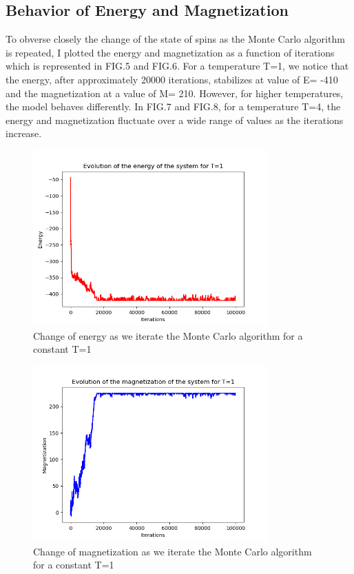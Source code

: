 \documentclass[aps,twocolumn,twoside,secnumarabic,balancelastpage,amsmath,amssymb,nofootinbib,hyperref=pdftex]{revtex4}
\begin{document}
\subsection{Behavior of Energy and Magnetization}
To obverse closely the change of the state of spins as the Monte Carlo algorithm is repeated, I plotted the energy and magnetization as a function of iterations which is represented in FIG.5 and FIG.6. For a temperature T=1, we notice that the energy, after approximately 20000 iterations, stabilizes at value of E= -410 and the magnetization at a value of M= 210. However, for higher temperatures, the model behaves differently. In FIG.7 and FIG.8, for a temperature T=4, the energy and magnetization fluctuate over a wide range of values as the iterations increase. 
\begin{figure}[htb]
\includegraphics[width=9cm]{E_iteration.png}	
\caption{Change of energy as we iterate the Monte Carlo algorithm for a constant T=1}
\end{figure}
\begin{figure}[htb]
\includegraphics[width=9cm]{M_iteration.png}	
\caption{Change of magnetization as we iterate the Monte Carlo algorithm for a constant T=1}
\end{figure}
\end{document}
